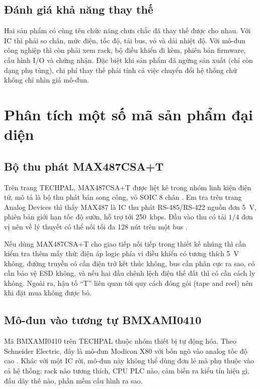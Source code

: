 \subsection{Đánh giá khả năng thay thế}

Hai sản phẩm có cùng tên chức năng chưa chắc đã thay thế được cho nhau. Với IC
thì phải so chân, mức điện, tốc độ, tải bus, vỏ và dải nhiệt độ. Với mô-đun
công nghiệp thì còn phải xem rack, bộ điều khiển đi kèm, phiên bản firmware, cấu
hình I/O và chứng nhận. Đặc biệt khi sản phẩm đã ngừng sản xuất (chỉ còn dạng
phụ tùng), chi phí thay thế phải tính cả việc chuyển đổi hệ thống chứ không chỉ
nhìn giá mô-đun.

\section{Phân tích một số mã sản phẩm đại diện}

\subsection{Bộ thu phát MAX487CSA+T}

Trên trang TECHPAL, MAX487CSA+T được liệt kê trong nhóm linh kiện điện tử, mô
tả là bộ thu phát bán song công, vỏ SOIC 8 chân \cite{techpal-max487}. Em tra
trên trang Analog Devices thì thấy MAX487 là IC thu phát RS-485/RS-422 nguồn đơn
5~V, phiên bản giới hạn tốc độ sườn, hỗ trợ tới 250~kbps. Đầu vào thu có tải
$1/4$ đơn vị nên về lý thuyết có thể nối tối đa 128 nút trên một bus
\cite{adi-max487}.

Nếu dùng MAX487CSA+T cho giao tiếp nối tiếp trong thiết kế nhúng thì cần kiểm
tra thêm mấy thứ: điện áp logic phía vi điều khiển có tương thích 5~V không,
đường truyền có cần điện trở kết thúc không, bus cần phân cực ra sao, có cần bảo
vệ ESD không, và nếu hai đầu chênh lệch điện thế đất thì có cần cách ly không.
Ngoài ra, hậu tố ``T'' liên quan tới quy cách đóng gói (tape and reel) nên khi
đặt mua không được bỏ.

\subsection{Mô-đun vào tương tự BMXAMI0410}

Mã BMXAMI0410 trên TECHPAL thuộc nhóm thiết bị tự động hóa. Theo Schneider
Electric, đây là mô-đun Modicon X80 với bốn ngõ vào analog tốc độ cao
\cite{schneider-bmxami0410}. Khác với một IC rời, mô-đun này không thể dùng
đơn lẻ mà phụ thuộc vào cả hệ thống: rack nào tương thích, CPU PLC nào, cảm
biến ra kiểu tín hiệu gì, đấu dây thế nào, phần mềm cấu hình ra sao.

